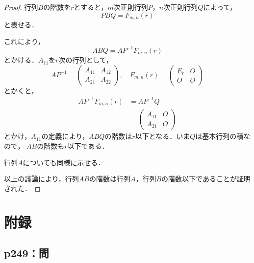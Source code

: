 \documentclass[uplatex,dvipdfmx,a4paper,10pt,fleqn]{jsarticle}
\begin{document}
\begin{leftbar}
    \begin{proof}
        行列$B$の階数を$r$とすると，$m$次正則行列$P$，$n$次正則行列$Q$によって，
        \[
            P B Q = F_{m,n} (r)
        \]
        と表せる．

        これにより，
        \[
            ABQ = A P^{-1} F_{m,n} (r) 
        \]
        とかける．$A_{11}$を$r$次の行列として，
        \[
            A P^{-1} = \begin{pmatrix} A_{11} & A_{12} \\ A_{21} & A_{22} \end{pmatrix}, \quad F_{m,n} (r) = \begin{pmatrix} E_r & O \\ O & O \end{pmatrix}
        \]
        とかくと，
        \begin{align*}
           A P^{-1} F_{m,n} (r)&= A P^{-1} Q \\
           & = \begin{pmatrix} A_{11}& O \\ A_{21} & O \end{pmatrix}
        \end{align*}
        とかけ，$A_{11}$の定義により，$ABQ$の階数は$r$以下となる．いま$Q$は基本行列の積なので， $AB$の階数も$r$以下である．

        行列$A$についても同様に示せる．
        
        以上の議論により，行列$AB$の階数は行列$A$，行列$B$の階数以下であることが証明された．

    \end{proof}
\end{leftbar}

\newpage 

\section*{附録\three}


\subsection*{p249：問}
\end{document}
